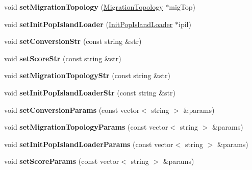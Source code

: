 \begin{DoxyCompactItemize}
\mbox{\label{classConfiguration_a04db857ce4bca94188daf0c2cf9f3dc3}} 
void {\bfseries set\+Migration\+Topology} (\mbox{\hyperlink{classMigrationTopology}{Migration\+Topology}} $\ast$mig\+Top)
\item 
\mbox{\label{classConfiguration_ac0048239ed62e460726e50925cbc1ed1}} 
void {\bfseries set\+Init\+Pop\+Island\+Loader} (\mbox{\hyperlink{classInitPopIslandLoader}{Init\+Pop\+Island\+Loader}} $\ast$ipil)
\item 
\mbox{\label{classConfiguration_a7211702ec314529d1ea990f2eb675c79}} 
void {\bfseries set\+Conversion\+Str} (const string \&str)
\item 
\mbox{\label{classConfiguration_a50053a0768041a7e934e9f90c647abc5}} 
void {\bfseries set\+Score\+Str} (const string \&str)
\item 
\mbox{\label{classConfiguration_afe82674f908ebea7bc91d248d7f8734a}} 
void {\bfseries set\+Migration\+Topology\+Str} (const string \&str)
\item 
\mbox{\label{classConfiguration_a3ac905f24197284605b0e626bbf43139}} 
void {\bfseries set\+Init\+Pop\+Island\+Loader\+Str} (const string \&str)
\item 
\mbox{\label{classConfiguration_a27dd910dd63923498a1c81385f60d361}} 
void {\bfseries set\+Conversion\+Params} (const vector$<$ string $>$ \&params)
\item 
\mbox{\label{classConfiguration_a4b4d865f8e3a49282b41602f2238bc2f}} 
void {\bfseries set\+Migration\+Topology\+Params} (const vector$<$ string $>$ \&params)
\item 
\mbox{\label{classConfiguration_a24d83c426ee9eaefd60dbf4c75d3de31}} 
void {\bfseries set\+Init\+Pop\+Island\+Loader\+Params} (const vector$<$ string $>$ \&params)
\item 
\mbox{\label{classConfiguration_ad027e159565f331b6e8d82daaedec30c}} 
void {\bfseries set\+Score\+Params} (const vector$<$ string $>$ \&params)

\end{DoxyCompactItemize}

